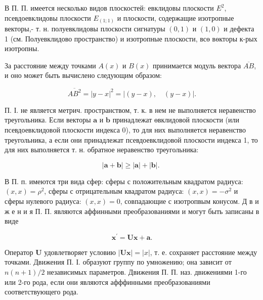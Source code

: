 \documentclass[10pt]{article}
\begin{document}
В П. П. имеется несколько видов плоскостей: евклидовы плоскости $E^{2}$, псевдоевклидовы плоскости $E_{(1 ; 1)}$ и плоскости, содержащие изотропные векторы,- т. н. полуевклидовы плоскости сигнатуры $(0,1)$ и $(1,0)$ и дефекта 1 (см. Полуевклидово пространство) и изотропные плоскости, всө вөкторы к-рых изотропны.



За расстояние между точками $A(x)$ и $B(x)$ принимается модуль вектора $\overline{A B}$, и оно может быть вычислено следующим образом:



\[

\overline{A B^{2}}=|y-x|^{2}=|(y-x), \quad(y-x)| .

\]



П. І. не является метрич. пространством, т. к. в нем не выполняется неравенство треугольника. Если векторы $\boldsymbol{a}$ и $\boldsymbol{b}$ принадлежат өвклидовой плоскости (или псевдоевклидовой плоскости индекса 0), то для них выполняется неравенство треугольника, а если они принадлежат псевдоевклидовой плоскости индекса 1, то для них выполняется т. н. обратное неравенство треугольника:



\[

|\boldsymbol{a}+\boldsymbol{b}| \geqslant|\boldsymbol{a}|+|\boldsymbol{b}| \text {. }

\]



В П. п. имеются три вида сфер: сферы с положительным квадратом радиуса: $(x, x)=\rho^{2}$, сферы с отрицательным квадратом радиуса: $(x, x)=-\sigma^{2}$ и сферы нулевого радиуса: $(x, x)=0$, совпадающие с изотропвым конусом. Д в и ж е н и я П. П. являются аффинными преобразованиями и могут быть записаны в виде



\[

\boldsymbol{x}^{\prime}=\boldsymbol{U} \boldsymbol{x}+\boldsymbol{a} .

\]



Оператор $\boldsymbol{U}$ удовлетворяет условию $|\boldsymbol{U} \boldsymbol{x}|=|x|$, т. е. сохраняет расстояние между точками. Движения П. І. образуют группу по умножению; она зависит от $n(n+1) / 2$ независимых параметров. Движения П. П. наз. движениями 1-го или 2-го рода, если они являются афффинными преобразованиями соответствующего рода.
\end{document}
